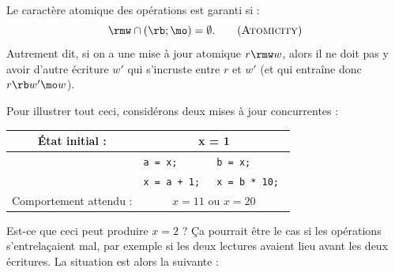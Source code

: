 Le caractère atomique des opérations est garanti si :
\[
  \rmw \cap (\rb ; \mo) = \emptyset. \tag{\textsc{Atomicity}}
\]
Autrement dit, si on a une mise à jour atomique $r \rmw w$, alors il ne doit pas
y avoir d'autre écriture $w'$ qui s'incruste entre $r$ et $w'$ (et qui entraîne
donc $r \rb w' \mo w$).

Pour illustrer tout ceci, considérons deux mises à jour concurrentes :
\begin{center}
\begin{tabular}{|c|p{2.5cm}||p{2.5cm}|}
  \hline
  État initial : & \multicolumn{2}{c|}{x = 1} \\
  \hline
                 & \tt a = x;     & \tt b = x; \\
                 & \tt x = a + 1; & \tt x = b * 10; \\
  \hline
  Comportement attendu : & \multicolumn{2}{c|}{$x = 11$ ou $x = 20$} \\
  \hline
\end{tabular}
\end{center}

Est-ce que ceci peut produire $x = 2$ ? Ça pourrait être le cas si les
opérations s'entrelaçaient mal, par exemple si les deux lectures avaient lieu
avant les deux écritures. La situation est alors la suivante :

\begin{center}
\end{center}


